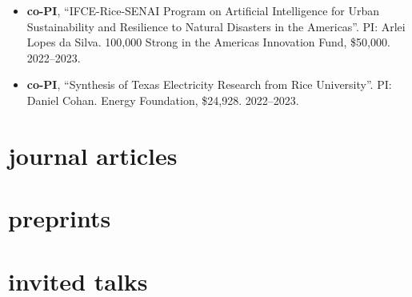 \documentclass[10pt,oneside]{article}
\begin{document}
\begin{itemize}[label={}]
  \item \textbf{co-PI}, \enquote{IFCE-Rice-SENAI Program on Artificial Intelligence for Urban Sustainability and Resilience to Natural Disasters in the Americas}.  PI: Arlei Lopes da Silva. 100,000 Strong in the Americas Innovation Fund, \$50,000. 2022--2023.

  \item \textbf{co-PI}, \enquote{Synthesis of Texas Electricity Research from Rice University}.  PI: Daniel Cohan. Energy Foundation, \$24,928. 2022--2023.

\end{itemize}


\section{journal articles}

\mbox{}\vspace{-\dimexpr\baselineskip\relax}
\vspace*{-1em}

\printbibliography[type=article, heading=none]

\section{preprints}

\mbox{}\vspace{-\dimexpr\baselineskip\relax}
\vspace*{-1em}
\printbibliography[filter=ispreprint, heading=none]


\section{invited talks}

\mbox{}\vspace{-\dimexpr\baselineskip\relax}
\end{document}
